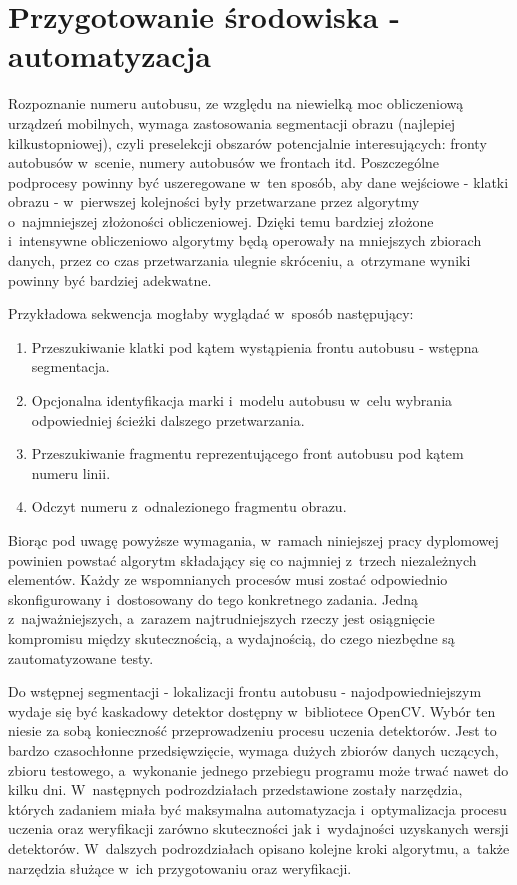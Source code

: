 \chapter{Przygotowanie środowiska - automatyzacja}

Rozpoznanie numeru autobusu, ze względu na niewielką moc obliczeniową
urządzeń mobilnych, wymaga zastosowania segmentacji obrazu 
(najlepiej kilkustopniowej), czyli preselekcji obszarów potencjalnie
interesujących: fronty autobusów w~scenie, numery autobusów
we frontach itd. Poszczególne podprocesy powinny być
uszeregowane w~ten sposób, aby dane wejściowe - klatki obrazu - 
w~pierwszej kolejności były przetwarzane przez algorytmy o~najmniejszej
złożoności obliczeniowej. Dzięki temu
bardziej złożone i~intensywne obliczeniowo algorytmy będą operowały 
na mniejszych zbiorach danych, przez co czas przetwarzania ulegnie
skróceniu, a~otrzymane wyniki powinny być bardziej adekwatne.

Przykładowa sekwencja mogłaby wyglądać
w~sposób następujący:

\begin{enumerate}
    \item Przeszukiwanie klatki pod kątem wystąpienia frontu autobusu -
        wstępna segmentacja.
    \item Opcjonalna identyfikacja marki i~modelu autobusu w~celu wybrania
    odpowiedniej ścieżki dalszego przetwarzania.
    \item Przeszukiwanie fragmentu reprezentującego front autobusu
        pod kątem numeru linii.
    \item Odczyt numeru z~odnalezionego fragmentu obrazu.
\end{enumerate}

Biorąc pod uwagę powyższe wymagania,
w~ramach niniejszej pracy dyplomowej powinien powstać algorytm 
składający się co najmniej z~trzech niezależnych elementów. 
Każdy ze wspomnianych procesów musi zostać odpowiednio skonfigurowany
i~dostosowany do tego konkretnego zadania. Jedną z~najważniejszych, 
a~zarazem najtrudniejszych rzeczy jest osiągnięcie kompromisu 
między skutecznością, a wydajnością, do czego niezbędne są 
zautomatyzowane testy.

Do wstępnej segmentacji - lokalizacji frontu autobusu - najodpowiedniejszym
wydaje się być kaskadowy detektor dostępny w~bibliotece OpenCV. 
Wybór ten niesie za sobą konieczność przeprowadzeniu procesu uczenia
detektorów. Jest to bardzo czasochłonne przedsięwzięcie, 
wymaga dużych zbiorów danych uczących, zbioru testowego, a~wykonanie
jednego przebiegu programu może trwać nawet do kilku dni. 
W~następnych podrozdziałach 
przedstawione zostały narzędzia, których
zadaniem miała być maksymalna automatyzacja i~optymalizacja procesu uczenia
oraz weryfikacji zarówno skuteczności jak i~wydajności uzyskanych wersji
detektorów. W~dalszych podrozdziałach opisano kolejne
kroki algorytmu, a~także narzędzia służące w~ich przygotowaniu oraz 
weryfikacji.

